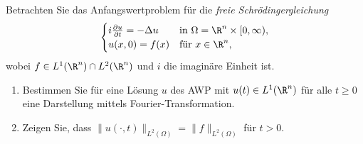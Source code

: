 
\begin{exercise}

Betrachten Sie das Anfangswertproblem für die \textit{freie Schrödingergleichung}
\begin{align*}
  \begin{cases}
  i\frac{\partial u}{\partial t} = -\Delta u & \text{in } \Omega = \R^n \times [0,\infty), \\
  u(x,0) = f(x) & \text{für } x \in \R^n,
  \end{cases}
\end{align*}
wobei $f \in L^1(\R^n) \cap L^2(\R^n)$ und $i$ die imaginäre Einheit ist.
\begin{enumerate}[label = (\roman*)]
  \item Bestimmen Sie für eine Lösung $u$ des AWP mit $u(t) \in L^1(\R^n)$
  für alle $t \geq 0$ eine Darstellung mittels Fourier-Transformation.
  \item Zeigen Sie, dass $\|u(\cdot,t)\|_{L^2(\Omega)} = \|f\|_{L^2(\Omega)}$ für $t > 0$.
\end{enumerate}

\end{exercise}


